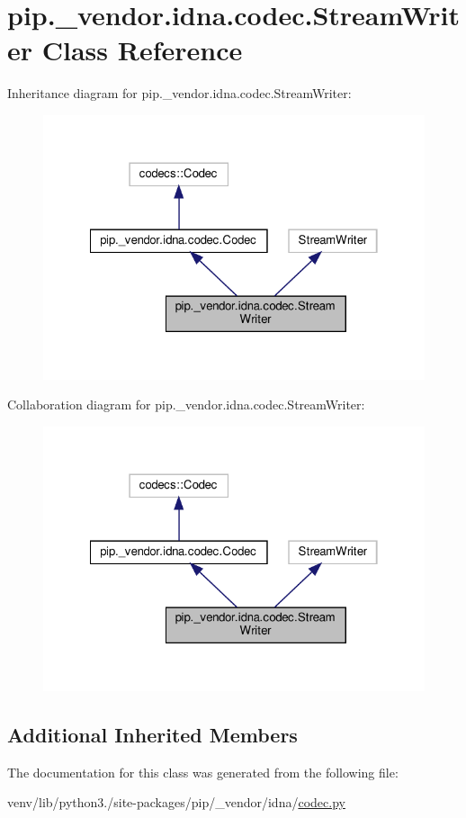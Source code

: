 \hypertarget{classpip_1_1__vendor_1_1idna_1_1codec_1_1StreamWriter}{}\section{pip.\+\_\+vendor.\+idna.\+codec.\+Stream\+Writer Class Reference}
\label{classpip_1_1__vendor_1_1idna_1_1codec_1_1StreamWriter}


Inheritance diagram for pip.\+\_\+vendor.\+idna.\+codec.\+Stream\+Writer\+:
\nopagebreak
\begin{figure}[H]
\begin{center}
\leavevmode
\includegraphics[width=322pt]{classpip_1_1__vendor_1_1idna_1_1codec_1_1StreamWriter__inherit__graph}
\end{center}
\end{figure}


Collaboration diagram for pip.\+\_\+vendor.\+idna.\+codec.\+Stream\+Writer\+:
\nopagebreak
\begin{figure}[H]
\begin{center}
\leavevmode
\includegraphics[width=322pt]{classpip_1_1__vendor_1_1idna_1_1codec_1_1StreamWriter__coll__graph}
\end{center}
\end{figure}
\subsection*{Additional Inherited Members}


The documentation for this class was generated from the following file\+:\begin{DoxyCompactItemize}
\item 
venv/lib/python3./site-\/packages/pip/\+\_\+vendor/idna/\hyperlink{codec_8py}{codec.\+py}\end{DoxyCompactItemize}
